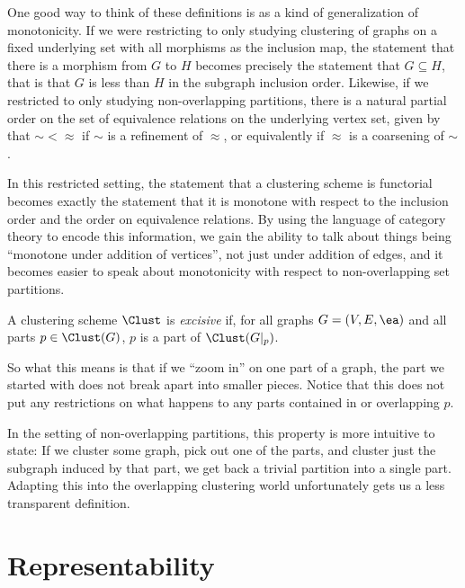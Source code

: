 \documentclass[a4paper,reqno,oneside]{article} %
\begin{document}
One good way to think of these definitions is as a kind of generalization of monotonicity. If we were restricting to only studying clustering of graphs on a fixed underlying set with all morphisms as the inclusion map, the statement that there is a morphism from $G$ to $H$ becomes precisely the statement that $G \subseteq H$, that is that $G$ is less than $H$ in the subgraph inclusion order. Likewise, if we restricted to only studying non-overlapping partitions, there is a natural partial order on the set of equivalence relations on the underlying vertex set, given by that $\sim < \approx$ if $\sim$ is a refinement of $\approx$, or equivalently if $\approx$ is a coarsening of $\sim$.

In this restricted setting, the statement that a clustering scheme is functorial becomes exactly the statement that it is monotone with respect to the inclusion order and the order on equivalence relations. By using the language of category theory to encode this information, we gain the ability to talk about things being ``monotone under addition of vertices'', not just under addition of edges, and it becomes easier to speak about monotonicity with respect to non-overlapping set partitions.

\begin{definition}
    A clustering scheme $\Clust$ is \emph{excisive} if, for all graphs $G = (V, E, \ea)$ and all parts $p \in \Clust(G)$, $p$ is a part of $\Clust(G|_p)$.

    So what this means is that if we ``zoom in'' on one part of a graph, the part we started with does not break apart into smaller pieces. Notice that this does not put any restrictions on what happens to any parts contained in or overlapping $p$.
\end{definition}

In the setting of non-overlapping partitions, this property is more intuitive to state: If we cluster some graph, pick out one of the parts, and cluster just the subgraph induced by that part, we get back a trivial partition into a single part. Adapting this into the overlapping clustering world unfortunately gets us a less transparent definition.

\section{Representability}
\end{document}
